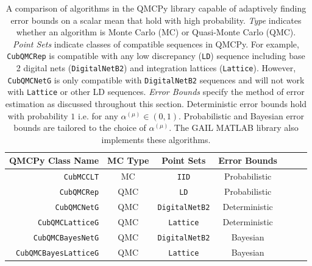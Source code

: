 \documentclass[graybox]{svmult}
\begin{document}
\begin{table}[t]
\centering
\begin{tabular}{r c c c c c c}
    QMCPy Class Name & MC Type & Point Sets & Error Bounds \\
    \hline
    \texttt{CubMCCLT} \cite{cubmcg} & MC & \texttt{IID} & Probabilistic \\
    \texttt{CubQMCRep} \cite{mcbook} & QMC & \texttt{LD} & Probabilistic \\
    \texttt{CubQMCNetG} \cite{cubqmcsobol} & QMC & \texttt{DigitalNetB2} & Deterministic \\
    \texttt{CubQMCLatticeG} \cite{cubqmclattice} & QMC & \texttt{Lattice} & Deterministic \\
    \texttt{CubQMCBayesNetG} \cite{cubqmcbayessobol} & QMC &  \texttt{DigitalNetB2} & Bayesian \\
    \texttt{CubQMCBayesLatticeG} \cite{cubqmcbayeslattice} & QMC & \texttt{Lattice} & Bayesian \\
    \hline
\end{tabular}
\caption{A comparison of algorithms in the QMCPy library capable of adaptively finding error bounds on a scalar mean that hold with high probability. \emph{Type} indicates whether an algorithm is Monte Carlo (MC) or Quasi-Monte Carlo (QMC). \emph{Point Sets} indicate classes of compatible sequences in QMCPy. For example, \texttt{CubQMCRep} is compatible with any low discrepancy (\texttt{LD}) sequence including base 2 digital nets (\texttt{DigitalNetB2}) and integration lattices (\texttt{Lattice}). However, \texttt{CubQMCNetG} is only compatible with \texttt{DigitalNetB2} sequences and will not work with \texttt{Lattice} or other LD sequences. \emph{Error Bounds} specify the method of error estimation as discussed throughout this section. Deterministic error bounds hold with probability $1$ i.e. for any $\alpha^{(\mu)} \in (0,1)$. Probabilistic and Bayesian error bounds are tailored to the choice of $\alpha^{(\mu)}$. The GAIL MATLAB library \cite{ChoEtal21a} also implements these algorithms.}
\label{SoRa_table:qmcpy_sc}
\end{table}
\end{document}
